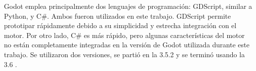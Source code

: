 Godot emplea principalmente dos lenguajes de programación: GDScript, similar a Python, y C\#. Ambos fueron utilizados en este trabajo. GDScript permite prototipar rápidamente debido a su simplicidad y estrecha integración con el motor. Por otro lado, C\# es más rápido, pero algunas características del motor no están completamente integradas en la versión de Godot utilizada durante este trabajo. Se utilizaron dos versiones, se partió en la 3.5.2 y se terminó usando la 3.6 \cite{GodotCSharpGDDifferences}.

